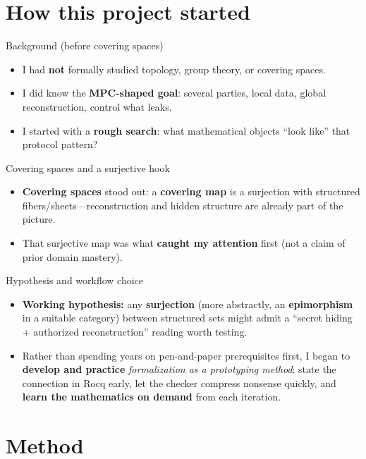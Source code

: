 \documentclass[10pt,aspectratio=169]{beamer}
\begin{document}
\section{How this project started}

\begin{frame}{Background (before covering spaces)}
  \begin{itemize}
    \item I had \textbf{not} formally studied topology, group theory, or covering spaces.
    \item I did know the \textbf{MPC-shaped goal}: several parties, local data, global reconstruction, control what leaks.
    \item I started with a \textbf{rough search}: what mathematical objects ``look like'' that protocol pattern?
  \end{itemize}
\end{frame}

\begin{frame}{Covering spaces and a surjective hook}
  \begin{itemize}
    \item \textbf{Covering spaces} stood out: a \textbf{covering map} is a surjection with structured fibers/sheets---reconstruction and hidden structure are already part of the picture.
    \item That surjective map was what \textbf{caught my attention} first (not a claim of prior domain mastery).
  \end{itemize}
\end{frame}

\begin{frame}{Hypothesis and workflow choice}
  \begin{itemize}
    \item \textbf{Working hypothesis:} any \textbf{surjection} (more abstractly, an \textbf{epimorphism} in a suitable category) between structured sets might admit a ``secret hiding + authorized reconstruction'' reading worth testing.
    \item Rather than spending years on pen-and-paper prerequisites first, I began to \textbf{develop and practice} \emph{formalization as a prototyping method}: state the connection in Rocq early, let the checker compress nonsense quickly, and \textbf{learn the mathematics on demand} from each iteration.
  \end{itemize}
\end{frame}

\section{Method}
\end{document}
